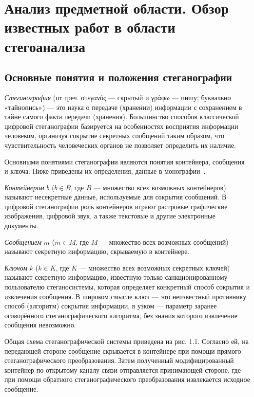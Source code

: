 
\section{Анализ предметной области. Обзор известных работ в области стегоанализа}

\subsection{Основные понятия и положения стеганографии}

\textit{Стеганография} (от греч. στεγανός — скрытый и γράφω — пишу; буквально «тайнопись») — это наука о передаче (хранении) информации с сохранением в тайне самого факта передачи (хранения). Большинство способов классической цифровой стеганографии базируется на особенностях восприятия информации человеком, организуя сокрытие секретных сообщений таким образом, что чувствительность человеческих органов не позволяет определить их наличие.

Основными понятиями стеганографии являются понятия контейнера, сообщения и ключа. Ниже приведены их определения, данные в монографии~\cite{Agranovskiy}.

\textit{Контейнером} $ b $ ($ b \in B $, где $ B $ — множество всех возможных контейнеров) называют несекретные данные, используемые для сокрытия сообщений. В цифровой стеганографии роль контейнеров играют растровые графические изображения, цифровой звук, а также текстовые и другие электронные документы.

\textit{Сообщением} $ m $ ($ m \in M $, где $ M $ — множество всех возможных сообщений) называют секретную информацию, скрываемую в контейнере.

\textit{Ключом} $ k $ ($ k \in K $, где $ K $ — множество всех возможных секретных ключей) называют секретную информацию, известную только санкционированному пользователю стеганосистемы, которая определяет конкретный способ сокрытия и извлечения сообщения. В широком смысле ключ — это неизвестный противнику способ (алгоритм) сокрытия информации, в узком — параметр заранее оговорённого стеганографического алгоритма, без знания которого извлечение сообщения невозможно.

Общая схема стеганографической системы приведена на рис. 1.1. Согласно ей, на передающей стороне сообщение скрывается в контейнере при помощи прямого стеганографического преобразования. Затем полученный модифицированный контейнер по открытому каналу связи отправляется принимающей стороне, где при помощи обратного стеганографического преобразования извлекается исходное сообщение.

